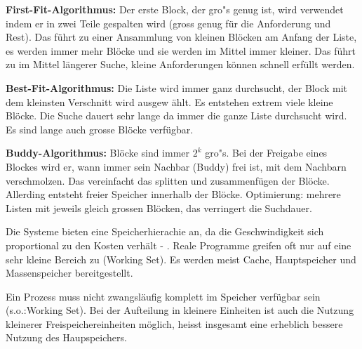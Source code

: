 \begin{answer}
  \textbf{First-Fit-Algorithmus:}
  Der erste Block, der gro"s genug ist, wird verwendet indem er in zwei Teile gespalten wird
  (gross genug für die Anforderung und Rest).
  Das führt zu einer Ansammlung von kleinen Blöcken am Anfang der Liste, es werden immer
  mehr Blöcke und sie werden im Mittel immer kleiner. Das führt zu im Mittel längerer
  Suche, kleine Anforderungen können schnell erfüllt werden.

  \textbf{Best-Fit-Algorithmus:}
  Die Liste wird immer ganz durchsucht, der Block mit dem kleinsten Verschnitt wird ausgew
  ählt.
  Es entstehen extrem viele kleine Blöcke. Die Suche dauert sehr lange da immer die ganze
  Liste durchsucht wird. Es sind lange auch grosse Blöcke verfügbar.

  \textbf{Buddy-Algorithmus:}
  Blöcke sind immer $2^k$ gro"s. Bei der Freigabe eines Blockes wird er, wann immer sein
  Nachbar (Buddy) frei ist, mit dem Nachbarn verschmolzen.
  Das vereinfacht das splitten und zusammenfügen der Blöcke. Allerding entsteht freier Speicher
  innerhalb der Blöcke.
  Optimierung: mehrere Listen mit jeweils gleich grossen Blöcken, das verringert die Suchdauer.
\end{answer}

\begin{answer}
  Die Systeme bieten eine Speicherhierachie an, da die Geschwindigkeit sich proportional zu den
  Kosten verhält - . Reale Programme greifen oft nur auf eine sehr kleine Bereich zu (Working Set). Es werden meist Cache, Hauptspeicher und Massenspeicher bereitgestellt.
\end{answer}

\begin{answer}
  Ein Prozess muss nicht zwangsläufig komplett im Speicher verfügbar sein (s.o.:Working
  Set). Bei der Aufteilung in kleinere Einheiten ist auch die Nutzung kleinerer Freispeichereinheiten möglich, heisst insgesamt eine erheblich bessere Nutzung des Haupspeichers.
\end{answer}

